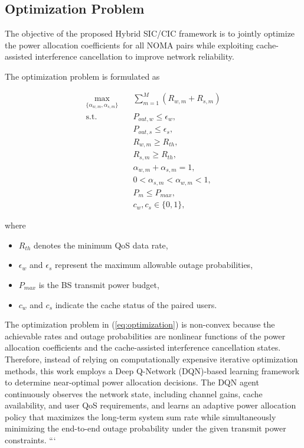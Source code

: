 \documentclass[conference]{IEEEtran}
\begin{document}
\subsection{Optimization Problem}

The objective of the proposed Hybrid SIC/CIC framework is to jointly optimize the power allocation coefficients for all NOMA pairs while exploiting cache-assisted interference cancellation to improve network reliability.

The optimization problem is formulated as

\begin{equation}
\begin{aligned}
\max_{\{\alpha_{w,m},\alpha_{s,m}\}}
\quad
&
\sum_{m=1}^{M}
\left(
R_{w,m}+R_{s,m}
\right)
\\
\text{s.t.}
\quad
&
P_{out,w}\le\epsilon_w,
\\
&
P_{out,s}\le\epsilon_s,
\\
&
R_{w,m}\ge R_{th},
\\
&
R_{s,m}\ge R_{th},
\\
&
\alpha_{w,m}+\alpha_{s,m}=1,
\\
&
0<\alpha_{s,m}<\alpha_{w,m}<1,
\\
&
P_m\le P_{max},
\\
&
c_w,c_s\in\{0,1\},
\end{aligned}
\label{eq:optimization}
\end{equation}

where

\begin{itemize}

\item $R_{th}$ denotes the minimum QoS data rate,

\item $\epsilon_w$ and $\epsilon_s$ represent the maximum allowable outage probabilities,

\item $P_{max}$ is the BS transmit power budget,

\item $c_w$ and $c_s$ indicate the cache status of the paired users.

\end{itemize}

The optimization problem in (\ref{eq:optimization}) is non-convex because the achievable rates and outage probabilities are nonlinear functions of the power allocation coefficients and the cache-assisted interference cancellation states. Therefore, instead of relying on computationally expensive iterative optimization methods, this work employs a Deep Q-Network (DQN)-based learning framework to determine near-optimal power allocation decisions. The DQN agent continuously observes the network state, including channel gains, cache availability, and user QoS requirements, and learns an adaptive power allocation policy that maximizes the long-term system sum rate while simultaneously minimizing the end-to-end outage probability under the given transmit power constraints.
```
\end{document}
